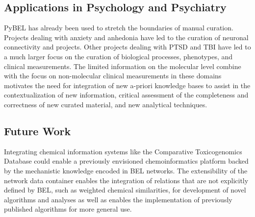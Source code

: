 \subsection{Applications in Psychology and Psychiatry}

PyBEL has already been used to stretch the boundaries of manual curation. Projects dealing with anxiety and anhedonia have led to the curation of neuronal connectivity and projects. Other projects dealing with \ac{PTSD} and \ac{TBI} have led to a much larger focus on the curation of biological processes, phenotypes, and clinical measurements. The limited information on the molecular level combine with the focus on non-molecular clinical measurements in these domains motivates the need for integration of new a-priori knowledge bases to assist in the contextualization of new information, critical assessment of the completeness and correctness of new curated material, and new analytical techniques.

\subsection{Future Work}

Integrating chemical information systems like the Comparative Toxicogenomics Database \cite{Davis2017} could enable a previously envisioned chemoinformatics platform \cite{Emon2017} backed by the mechanistic knowledge encoded in \ac{BEL} networks. The extensibility of the network data container enables the integration of relations that are not explicitly defined by \ac{BEL}, such as weighted chemical similarities, for development of novel algorithms and analyses as well as enables the implementation of previously published algorithms for more general use. 
